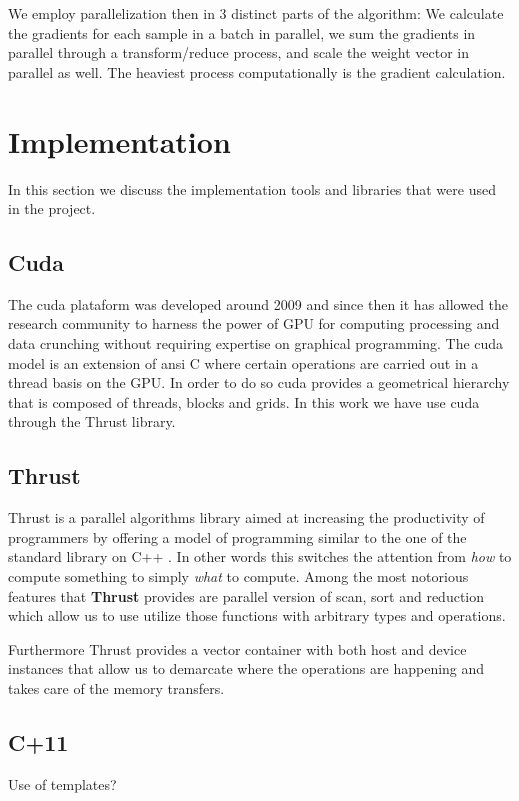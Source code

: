 \documentclass[11pt,a4paper]{article}
\begin{document}
We employ parallelization then in 3 distinct parts of the algorithm: We calculate the gradients for each sample in a batch in parallel, we sum the gradients in parallel through a transform/reduce process, and scale the weight vector in parallel as well. The heaviest process computationally is the gradient calculation.


\section{Implementation}
In this section we discuss the implementation tools and libraries that were used in the project.

\subsection{Cuda}
The cuda plataform was developed around 2009 \citep{nickolls2008scalable} and since then it has allowed the research community to harness the power of GPU for computing processing and data crunching without requiring expertise on graphical programming. The cuda model is an extension of ansi C where certain operations are carried out in a thread basis on the GPU. In order to do so cuda provides a geometrical hierarchy that is composed of threads, blocks and grids. In this work we have use cuda through the Thrust library.

\subsection{Thrust}
Thrust is a parallel algorithms library aimed at increasing the productivity of programmers by offering a model of programming similar to the one of the standard library on C++ \citep{bell2012thrust}. In other words this switches the attention from \textit{how} to compute something to simply \textit{what} to compute. Among the most notorious features that \textbf{Thrust} provides are parallel version of scan, sort and reduction which allow us to use utilize those functions with arbitrary types and operations.

Furthermore Thrust provides a vector container with both host and device instances that allow us to demarcate where the operations are happening and takes care of the memory transfers. 
 

\subsection{C+11}
Use of templates?
\end{document}
